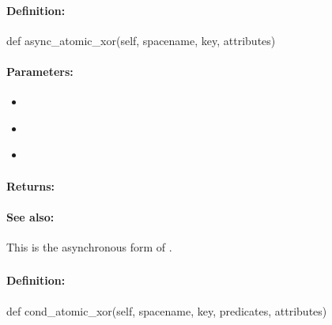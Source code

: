 \paragraph{Definition:}
\begin{pythoncode}
def async_atomic_xor(self, spacename, key, attributes)
\end{pythoncode}

\paragraph{Parameters:}
\begin{itemize}[noitemsep]
\item {}\\

\item {}\\

\item {}\\

\end{itemize}

\paragraph{Returns:}


\paragraph{See also:}  This is the asynchronous form of .

\pagebreak
\subsubsection{}
\label{api:python:cond_atomic_xor}


\paragraph{Definition:}
\begin{pythoncode}
def cond_atomic_xor(self, spacename, key, predicates, attributes)
\end{pythoncode}

